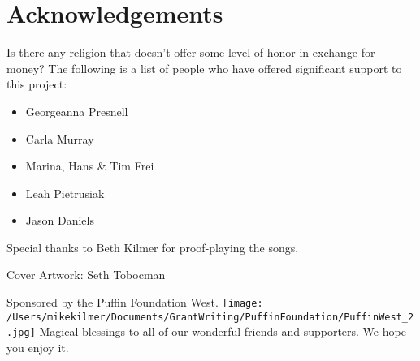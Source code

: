 \documentclass[11pt, twoside]{book}   	%
\begin{document}
\section{Acknowledgements}

Is there any religion that doesn't offer some level of honor in exchange for money?
\newline
The following is a list of people who have offered significant support to this project:
  
\begin{itemize}   
  \item Georgeanna Presnell
  \item Carla Murray
  \item Marina, Hans \& Tim Frei
  \item Leah Pietrusiak
  \item Jason Daniels
\end{itemize}    

  
  Special thanks to Beth Kilmer for proof-playing the songs.
   \newline
   
   
  Cover Artwork: Seth Tobocman
  \newline
  
  Sponsored by the Puffin Foundation West.
  \texttt{[image: /Users/mikekilmer/Documents/GrantWriting/PuffinFoundation/PuffinWest\_2.jpg]}
  \newline
  \newline
  Magical blessings to all of our wonderful friends and supporters.
  \newline
  \newline
  We hope you enjoy it.












\end{document}
